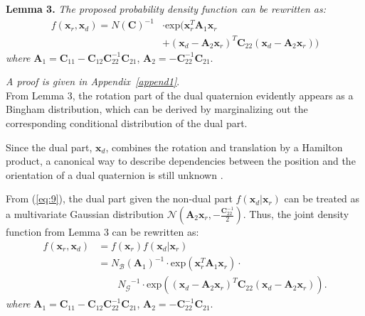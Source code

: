 \documentclass[micromachines,article,accept,pdftex,moreauthors]{Definitions/mdpi}
\begin{document}
\noindent\textbf{Lemma 3.} \textit{The proposed probability density function can be rewritten as:}
\begin{align*}
    f(\boldsymbol{x}_{r},\boldsymbol{x}_{d})
    = N(\boldsymbol{C})^{-1} & \cdot  
    \text{exp}(\boldsymbol{x}_{r}^{T} \boldsymbol{A}_{1} \boldsymbol{x}_{r} \\
    & + {(\boldsymbol{x}_{d}-\boldsymbol{A}_2\boldsymbol{x}_{r})^{T} \boldsymbol{C}_{22} (\boldsymbol{x}_{d}-\boldsymbol{A}_2\boldsymbol{x}_{r})})
\end{align*}
\textit{where} $\boldsymbol{A}_{1} = \boldsymbol{C}_{11} - \boldsymbol{C}_{12}\boldsymbol{C}_{22}^{-1} \boldsymbol{C}_{21}$, $\boldsymbol{A}_{2} = -\boldsymbol{C}_{22}^{-1}\boldsymbol{C}_{21}$.

\textit{A proof is given in Appendix~\ref{append1}}.\\

From {Lemma 3}, the rotation part of the dual quaternion evidently appears as a Bingham distribution, which can be derived by marginalizing out the corresponding conditional distribution of the dual part.

Since the dual part, $\boldsymbol{x}_{d}$, combines the rotation and translation by a Hamilton product, a canonical way to describe dependencies between the position and the orientation of a dual quaternion is still unknown \cite{gilitschenskiNewProbabilityDistribution2014}. 

From (\ref{eq:9}), the dual part given the non-dual part $f(\boldsymbol{x}_{d} | \boldsymbol{x}_{r})$ can be treated as a multivariate Gaussian distribution $\mathcal{N}(\boldsymbol{A}_2\boldsymbol{x}_r, -\frac{\boldsymbol{C}_{22}^{-1}}{2})$. Thus, the joint density function from Lemma 3 can be rewritten as:
\begin{align*}
    f(\boldsymbol{x}_{r},\boldsymbol{x}_{d}) & = f(\boldsymbol{x}_{r})f(\boldsymbol{x}_{d}|\boldsymbol{x}_{r})
    \\ 
    & = {{N_{\mathcal{B}}}(\boldsymbol{A}_1)}^{-1} \cdot  \text{exp}\left(\boldsymbol{x}_{r}^{T} \boldsymbol{A}_{1} \boldsymbol{x}_{r}\right) \cdot \\
    & {\qquad} {N_{\mathcal{G}}}^{-1}  \cdot \text{exp}\left(
    {(\boldsymbol{x}_{d}-\boldsymbol{A}_2\boldsymbol{x}_{r})^{T} \boldsymbol{C}_{22} (\boldsymbol{x}_{d}-\boldsymbol{A}_2\boldsymbol{x}_{r})}
    \right).
\end{align*}
\textit{where} $\boldsymbol{A}_{1} = \boldsymbol{C}_{11} - \boldsymbol{C}_{12}\boldsymbol{C}_{22}^{-1} \boldsymbol{C}_{21}$, $\boldsymbol{A}_{2} = -\boldsymbol{C}_{22}^{-1}\boldsymbol{C}_{21}$.
\end{document}
